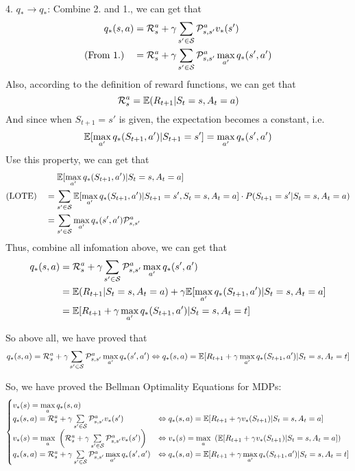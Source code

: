 \begin{homeworkProblem}
4. $q_*\to q_*$: Combine 2. and 1., we can get that
\begin{align*}
q_*(s,a) &= \mathcal{R}_s^a + \gamma \sum\limits_{s' \in \mathcal{S}} \mathcal{P}_{s,s'}^av_*(s') \\
\text{(From 1.)}\quad &= \mathcal{R}_s^a + \gamma \sum\limits_{s' \in \mathcal{S}} \mathcal{P}_{s,s'}^a\max_{a'} q_*(s',a')
\end{align*}
Also, according to the definition of reward functions, we can get that
$$\mathcal{R}_s^a=\mathbb{E}(R_{t+1}|S_t=s, A_t=a)$$
And since when $S_{t+1}=s'$ is given, the expectation becomes a constant, i.e.
$$\mathbb{E}[\max_{a'}q_*(S_{t+1},a')|S_{t+1}=s']=\max_{a'}q_*(s',a')$$
Use this property, we can get that
\begin{align*}
&\quad\ \mathbb{E}[\max_{a'}q_*(S_{t+1},a')|S_t=s, A_t=a] \\
\text{(LOTE)}\quad &= \sum_{s' \in \mathcal{S}} \mathbb{E}[\max_{a'}q_*(S_{t+1},a') |S_{t+1} = s', S_t = s, A_t = a]\cdot P(S_{t+1} = s'| S_t = s, A_t = a) \\
&= \sum_{s' \in \mathcal{S}} \max_{a'}q_*(s',a') \mathcal{P}_{s,s'}^a
\end{align*}
Thus, combine all infomation above, we can get that
\begin{align*}
q_*(s,a) &= \mathcal{R}_s^a + \gamma \sum\limits_{s' \in \mathcal{S}} \mathcal{P}_{s,s'}^a\max_{a'} q_*(s',a') \\
&= \mathbb{E}(R_{t+1}|S_t=s, A_t=a) + \gamma\mathbb{E}[\max_{a'}q_*(S_{t+1},a')|S_t=s, A_t=a] \\
&= \mathbb{E}[R_{t+1} + \gamma \max_{a'}q_*(S_{t+1},a')|S_t=s, A_t=t]
\end{align*}

So above all, we have proved that
$$q_{*}(s,a) = \mathcal{R}_s^a + \gamma \sum\limits_{s' \in \mathcal{S}} \mathcal{P}_{s,s'}^a\max_{a'} q_*(s',a') \Leftrightarrow q_{*}(s,a) = \mathbb{E}[R_{t+1} + \gamma \max_{a'}q_*(S_{t+1},a')|S_t=s, A_t=t]$$

So, we have proved the Bellman Optimality Equations for MDPs:
$$\begin{cases}
v_*(s) = \max\limits_{a} q_*(s,a) \\
q_{*}(s,a) = \mathcal{R}_s^a + \gamma \sum\limits_{s' \in \mathcal{S}} \mathcal{P}_{s,s'}^av_*(s') &\Leftrightarrow q_*(s,a) = \mathbb{E}[R_{t+1}+\gamma v_*(S_{t+1})|S_t=s,A_t=a] \\
v_*(s) = \max\limits_{a}\ \left(\mathcal{R}_s^a + \gamma \sum\limits_{s' \in \mathcal{S}} \mathcal{P}_{s,s'}^av_*(s')\right) &\Leftrightarrow v_*(s) = \max\limits_{a}\ \left(\mathbb{E}[R_{t+1}+\gamma v_*(S_{t+1})|S_t=s,A_t=a]\right) \\
q_{*}(s,a) = \mathcal{R}_s^a + \gamma \sum\limits\limits_{s' \in \mathcal{S}} \mathcal{P}_{s,s'}^a\max\limits_{a'} q_*(s',a') &\Leftrightarrow q_{*}(s,a) = \mathbb{E}[R_{t+1} + \gamma \max\limits_{a'}q_*(S_{t+1},a')|S_t=s, A_t=t]
\end{cases}$$


\end{homeworkProblem}
